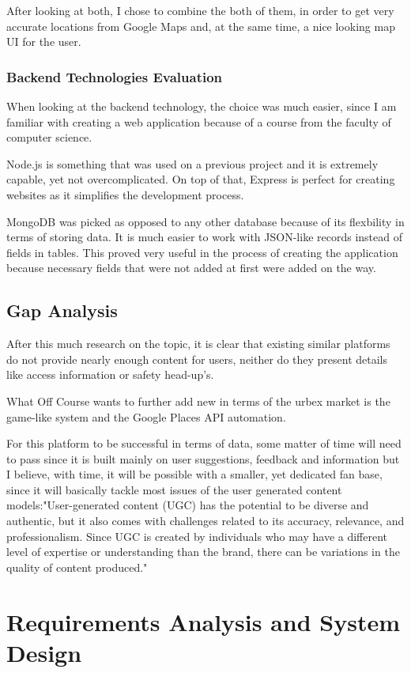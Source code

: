 \documentclass[12pt,a4paper]{report}
\begin{document}
After looking at both, I chose to combine the both of them, in order to get very accurate locations from Google Maps and, at the same time, a nice looking map UI for the user.

\subsection{Backend Technologies Evaluation}
When looking at the backend technology, the choice was much easier, since I am familiar with creating a web application because of a course from the faculty of computer science. 

Node.js is something that was used on a previous project and it is extremely capable, yet not overcomplicated. On top of that, Express is perfect for creating websites as it simplifies the development process.

MongoDB was picked as opposed to any other database because of its flexbility in terms of storing data. It is much easier to work with JSON-like records instead of fields in tables. This proved very useful in the process of creating the application because necessary fields that were not added at first were added on the way.

\section{Gap Analysis}
After this much research on the topic, it is clear that existing similar platforms do not provide nearly enough content for users, neither do they present details like access information or safety head-up's. 

What Off Course wants to further add new in terms of the urbex market is the game-like system and the Google Places API automation.

For this platform to be successful in terms of data, some matter of time will need to pass since it is built mainly on user suggestions, feedback and information but I believe, with time, it will be possible with a smaller, yet dedicated fan base, since it will basically tackle most issues of the user generated content models:"User-generated content (UGC) has the potential to be diverse and authentic, but it also comes with challenges related to its accuracy, relevance, and professionalism. Since UGC is created by individuals who may have a different level of expertise or understanding than the brand, there can be variations in the quality of content produced."~\cite{ugcChallenges}


\chapter{Requirements Analysis and System Design}
\end{document}
